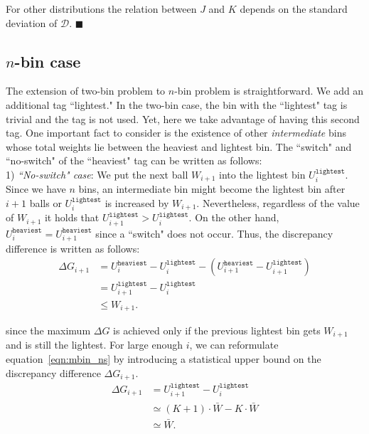 \documentclass[12pt,psfig,a4]{article}
\theoremstyle{plain}
\begin{document}
For other distributions the relation between $J$ and $K$ depends on the standard deviation of $\mathcal{D}$. $\blacksquare$

\subsection{$n$-bin case}
The extension of two-bin problem to $n$-bin problem is straightforward. We add an additional tag ``lightest." In the two-bin case, the bin with the ``lightest" tag is trivial and the tag is not used. Yet, here we take advantage of having this second tag. One important fact to consider is the existence of other \textit{intermediate} bins whose total weights lie between the heaviest and lightest bin. The ``switch" and ``no-switch" of the ``heaviest" tag can be written as follows:\\
1) \textit{``No-switch" case}: We put the next ball $W_{i+1}$ into the lightest bin $U_{i}^{\texttt{lightest}}$. Since we have $n$ bins, an intermediate bin might become the lightest bin after $i+1$ balls or $U_{i}^{\texttt{lightest}}$ is increased by $W_{i+1}$. Nevertheless, regardless of the value of $W_{i+1}$ it holds that $U_{i+1}^{\texttt{lightest}}>U_{i}^{\texttt{lightest}}$. On the other hand, $U_{i}^{\texttt{heaviest}} = U_{i+1}^{\texttt{heaviest}}$ since a ``switch" does not occur. Thus, the discrepancy difference is written as follows:
\begin{align}
\nonumber
	\Delta G_{i+1}&= U_{i}^{\texttt{heaviest}} - U_{i}^{\texttt{lightest}} - (U_{i+1}^{\texttt{heaviest}} - U_{i+1}^{\texttt{lightest}})  \\ \nonumber
	&= U_{i+1}^{\texttt{lightest}} - U_{i}^{\texttt{lightest}} \\
	&\leq W_{i+1}.
	\label{eqn:mbin_ns}
\end{align}

since the maximum $\Delta G$ is achieved only if the previous lightest bin gets $W_{i+1}$ and is still the lightest. 
For large enough $i$, we can reformulate equation~\ref{eqn:mbin_ns} by introducing a statistical upper bound on the discrepancy difference $\Delta G_{i+1}$. \\
\begin{align}
	\nonumber
	\Delta G_{i+1} &= U_{i+1}^{\texttt{lightest}} - U_{i}^{\texttt{lightest}}   \\  \nonumber
	&\simeq (K+1) \cdot \bar{W} - K \cdot \bar{W} \\
	&\simeq \bar{W}	.
	\label{eqn:mbin_ns_stats}
\end{align}
\end{document}
